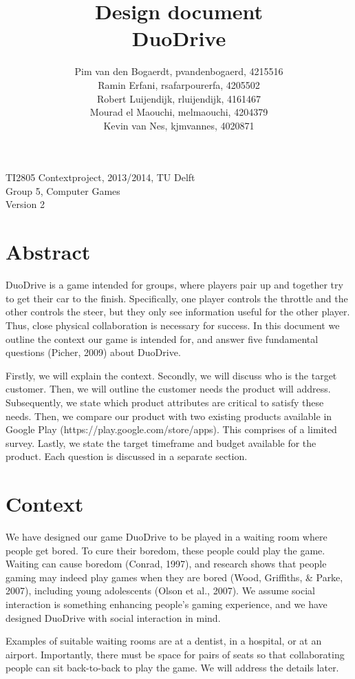 \documentclass[11pt,twoside,a4paper]{article}
\title{
  Design document\\
  DuoDrive
}
\author{
	Pim van den Bogaerdt, pvandenbogaerd, 4215516\\
	Ramin Erfani, rsafarpourerfa, 4205502\\
	Robert Luijendijk, rluijendijk, 4161467\\
	Mourad el Maouchi, melmaouchi, 4204379\\
	Kevin van Nes, kjmvannes, 4020871
}
\begin{document}
\maketitle
\begin{center}
TI2805 Contextproject, 2013/2014, TU Delft\\
Group 5, Computer Games\\
Version 2
\end{center}
\clearpage

\section*{Abstract}
DuoDrive is a game intended for groups, where players pair up and together try to get their car to the finish. Specifically, one player controls the throttle and the other controls the steer, but they only see information useful for the other player. Thus, close physical collaboration is necessary for success. In this document we outline the context our game is intended for, and answer five fundamental questions (Picher, 2009) about DuoDrive.

Firstly, we will explain the context. Secondly, we will discuss who is the target customer. Then, we will outline the customer needs the product will address. Subsequently, we state which product attributes are critical to satisfy these needs. Then, we compare our product with two existing products available in Google Play (https://play.google.com/store/apps). This comprises of a limited survey. Lastly, we state the target timeframe and budget available for the product. Each question is discussed in a separate section.

\clearpage
\tableofcontents

\clearpage

\section{Context}
We have designed our game DuoDrive to be played in a waiting room where people get bored. To cure their boredom, these people could play the game. Waiting can cause boredom (Conrad, 1997), and research shows that people gaming may indeed play games when they are bored (Wood, Griffiths, \& Parke, 2007), including young adolescents (Olson et al., 2007). We assume social interaction is something enhancing people's gaming experience, and we have designed DuoDrive with social interaction in mind.

Examples of suitable waiting rooms are at a dentist, in a hospital, or at an airport. Importantly, there must be space for pairs of seats so that collaborating people can sit back-to-back to play the game. We will address the details later.
\end{document}
